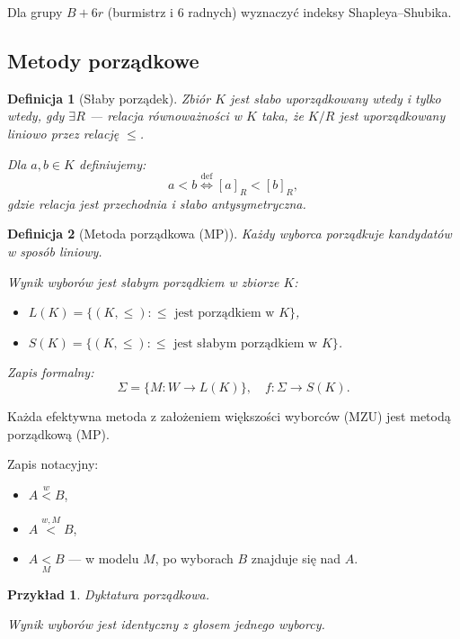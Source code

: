 \documentclass[12pt,a4paper]{article}
\theoremstyle{break}
\newtheorem{definition}{Definicja}[section]
\newtheorem{example}{Przykład}[section]
\begin{document}
	\begin{zad}
		Dla grupy $B + 6r$ (burmistrz i 6 radnych) wyznaczyć indeksy Shapleya–Shubika.
	\end{zad}
	
	\subsection{Metody porządkowe}
	
	\begin{definition}[Słaby porządek]
		Zbiór $K$ jest słabo uporządkowany wtedy i tylko wtedy, gdy $\exists R$ — relacja równoważności w $K$ taka, że $K / R$ jest uporządkowany liniowo przez relację $\leq$. 
		
		Dla $a, b \in K$ definiujemy: 
		\[
		a < b \overset{\text{def}}{\Leftrightarrow} [a]_R < [b]_R,
		\]
		gdzie relacja jest przechodnia i słabo antysymetryczna.
	\end{definition}
	
	\begin{definition}[Metoda porządkowa (MP)]
		Każdy wyborca porządkuje kandydatów w sposób liniowy.
		
		Wynik wyborów jest słabym porządkiem w zbiorze $K$:
		\begin{itemize}
			\item $L(K) = \{(K, \leq) : \leq \text{ jest porządkiem w } K\}$,
			\item $S(K) = \{(K, \leq) : \leq \text{ jest słabym porządkiem w } K\}$.
		\end{itemize}
		
		Zapis formalny:
		\[
		\Sigma = \{ M : W \rightarrow L(K) \}, \quad f : \Sigma \rightarrow S(K).
		\]
	\end{definition}
	
	Każda efektywna metoda z założeniem większości wyborców (MZU) jest metodą porządkową (MP).
	
	Zapis notacyjny:
	\begin{itemize}
		\item $A \overset{w}{<} B$, 
		\item $A \overset{w, M}{<} B$, 
		\item $A \underset{M}{<} B$ — w modelu $M$, po wyborach $B$ znajduje się nad $A$.
	\end{itemize}
	
	\begin{example}
		Dyktatura porządkowa.  
		
		Wynik wyborów jest identyczny z głosem jednego wyborcy.
	\end{example}
	
\end{document}
